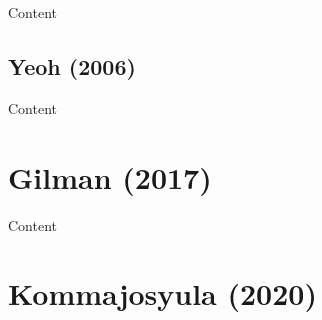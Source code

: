 Content


\subsection{Yeoh (2006)}

Content


\section{Gilman (2017)}

Content

\section{Kommajosyula (2020)}

